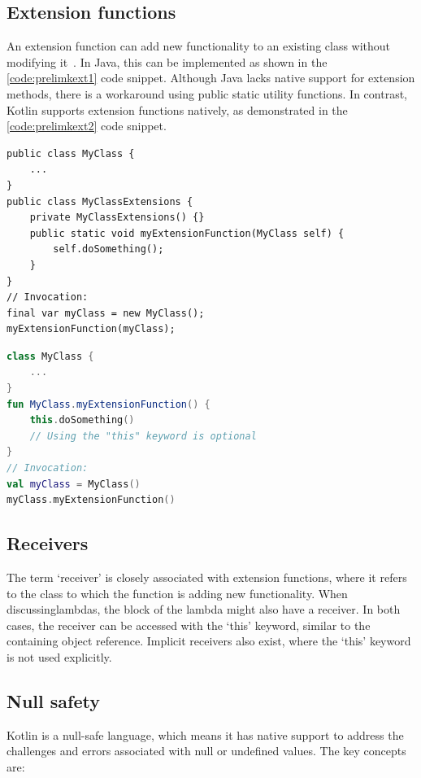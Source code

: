 \subsection{Extension functions}
\label{sec:extension}

An extension function can add new functionality to an existing class without modifying it~\cite{KExt}. In Java, this can be implemented as shown in the \ref{code:prelimkext1} code snippet. Although Java lacks native support for extension methods, there is a workaround using public static utility functions. In contrast, Kotlin supports extension functions natively, as demonstrated in the \ref{code:prelimkext2} code snippet.

\begin{lstlisting}[caption={Extension functions in Java},language=Java11,label=code:prelimkext1]
public class MyClass {
    ...
}
public class MyClassExtensions {
    private MyClassExtensions() {}
    public static void myExtensionFunction(MyClass self) {
        self.doSomething();
    }
}
// Invocation:
final var myClass = new MyClass();
myExtensionFunction(myClass);
\end{lstlisting}

\begin{lstlisting}[caption={Extension functions in Kotlin},language=Kotlin,label=code:prelimkext2]
class MyClass {
    ...
}
fun MyClass.myExtensionFunction() {
    this.doSomething()
    // Using the "this" keyword is optional
}
// Invocation:
val myClass = MyClass()
myClass.myExtensionFunction()
\end{lstlisting}

\subsection{Receivers}

The term `receiver' is closely associated with extension functions, where it refers to the class to which the function is adding new functionality. When discussinglambdas, the block of the lambda might also have a receiver. In both cases, the receiver can be accessed with the `this' keyword, similar to the containing object reference. Implicit receivers also exist, where the `this' keyword is not used explicitly.

\subsection{Null safety}

Kotlin is a null-safe language, which means it has native support to address the challenges and errors associated with null or undefined values. The key concepts are:

